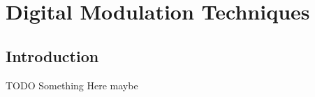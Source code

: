 \documentclass[../../DMCC-My-Notebook]{subfiles}
\begin{document}
	\ifSubfilesClassLoaded{ \pagestyle{fancy} }{}
	
	
	\section{Digital Modulation Techniques}
	
		\subsection{Introduction}
			TODO Something Here maybe
			
		\pagebreak
			
			
		
			
			
\end{document}

